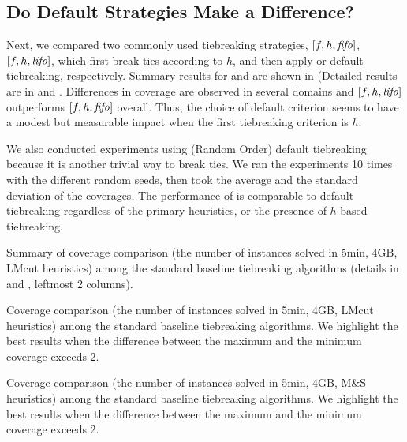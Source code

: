 \subsection{Do Default Strategies Make a Difference?}

Next, we  compared two commonly used tiebreaking strategies, $[f,h,{\text{\textit{fifo}}}]$, $[f,h,{\text{\textit{lifo}}}]$, which
first break ties according to $h$, and then apply \fifo or \lifo
default tiebreaking, respectively.
Summary results for \lmcut and \mands are
shown in  (Detailed results are in  and .
Differences in coverage are observed in several domains and $[f,h,{\text{\textit{lifo}}}]$ outperforms $[f,h,{\text{\textit{fifo}}}]$ overall. Thus, the choice of default criterion seems to have a modest but measurable impact when the first tiebreaking criterion is $h$.

We also conducted experiments using \ro (Random Order) default tiebreaking because it is another trivial way to
break ties. We ran the experiments 10 times with the different random seeds, then took the average and the
standard deviation of the coverages. The performance of \ro is comparable to \fifo default tiebreaking regardless
of the primary heuristics, or the presence of $h$-based tiebreaking.

\begin{table}[htbp]
 {
 \centering
 
 \caption{
 Summary of coverage comparison (the number of instances solved in 5min, 4GB, LMcut
 heuristics) among
 the standard baseline tiebreaking algorithms (details in  and , leftmost 2 columns). 
 }
 \label{tbl:summary-std}
 }
\end{table}


\begin{table}[htbp]
 {
 \centering
 
 \caption{
 Coverage comparison (the number of instances solved in 5min, 4GB, LMcut
 heuristics) among
 the standard baseline tiebreaking algorithms. We highlight the
 best results when the difference between the maximum and the minimum coverage exceeds 2.
 }
 \label{tbl:lmcut-ipc-std}
 }
\end{table}

\begin{table}[htbp]
 {
 \centering
 
 \caption{
 Coverage comparison (the number of instances solved in 5min, 4GB, M\&S heuristics) among
 the standard baseline tiebreaking algorithms. We highlight the
 best results when the difference between the maximum and the minimum coverage exceeds 2.
 }
 \label{tbl:mands-ipc-std}
 }
\end{table}


